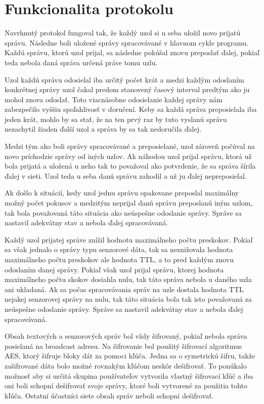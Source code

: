 \documentclass[slovak,master]{diploma}
\begin{document}
\section{Funkcionalita protokolu}
Navrhnutý protokol fungoval tak, že každý uzol si u seba uložil novo prijatú správu. Následne boli uložené správy spracovávané v hlavnom cykle programu. 
Každú správu, ktorú uzol prijal, sa následne pokúšal znovu preposlať ďalej, pokiaľ teda nebola daná správa určená práve tomu uzlu.

Uzol každú správu odosielal iba určitý počet krát a medzi každým odoslaním konkrétnej správy uzol čakal predom stanovený časový interval predtým ako ju mohol znova odoslať.
Toto viacnásobne odosielanie každej správy nám zabezpečilo vyššiu spoľahlivosť v doručení. Keby sa každá správa preposielala iba jeden krát, mohlo by sa stať, že na ten prvý raz 
by tuto vyslanú správu nezachytil žiaden ďalší uzol a správa by sa tak nedoručila ďalej.

Medzi tým ako boli správy spracovávané a preposielané, uzol zároveň počúval na novo príchodzie správy od iných uzlov. Ak náhodou uzol 
prijal správu, ktorá už bola prijatá a uložená u neho tak to považoval ako potvrdenie, že sa správa šírila ďalej v sieti. Uzol teda u seba danú správu zahodil a už ju 
ďalej nepreposielal.

Ak došlo k situácií, kedy uzol jednu správu opakovane preposlal maximálny možný počet pokusov a medzitým neprijal danú správu preposlanú iným uzlom, 
tak bola považovaná táto situácia ako neúspešne odoslanie správy. Správe sa nastavil adekvátny stav a nebola ďalej spracovávaná.

Každý uzol prijatej správe znížil hodnotu maximálneho počtu preskokov. Pokiaľ sa však jednalo o správy typu senzorové dáta, tak sa neznižovala hodnota maximálneho počtu preskokov 
ale hodnota TTL, a to pred každým znovu odoslaním danej správy. Pokiaľ však uzol prijal správu, ktorej hodnota maximálneho počtu skokov dosiahla nulu, tak táto 
správa nebola u daného uzla ani ukladaná. Ak sa počas spracovávania správ na uzle dostala hodnota TTL nejakej senzorovej správy na nulu, tak táto situácia bola tak isto považovaná 
za neúspešne odoslanie správy. Správe sa nastavil adekvátny stav a nebola ďalej spracovávaná.

Obsah textových a senzorových správ bol vždy šifrovaný, pokiaľ nebola správa posielaná na broadcast adresu. Na šifrovanie bol použitý šifrovací algoritmus AES, ktorý šifruje bloky dát za pomoci kľúča.
Jedna sa o symetrickú šifru, takže zašifrované dáta bolo možné rovnakým kľúčom neskôr dešifrovať. To ponúkalo možnosť aby si určitá skupina používateľov vytvorila vlastný 
šifrovací kľúč a iba oni boli schopní dešifrovať svoje správy, ktoré boli vytvorené za použitia tohto kľúča. Ostatní účastníci siete obsah správ neboli schopní dešifrovať.
\end{document}
